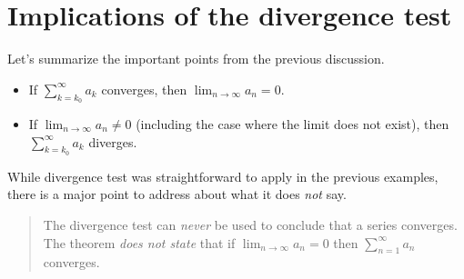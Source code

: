 \documentclass{ximera}
\begin{document}

\section{Implications of the divergence test}

Let's summarize the important points from the previous discussion.

\begin{itemize}
\item If $\sum_{k=k_0}^\infty a_k$ converges, then $\lim_{n \to \infty} a_n =0$.
\item If $\lim_{n \to \infty} a_n \neq 0$ (including the case where the limit does not exist), then $\sum_{k=k_0}^{\infty} a_k$ diverges.
\end{itemize}


While divergence test was straightforward to apply in the previous examples, there is a major point to address about what it does \emph{not} say.

\begin{quote}
  The divergence test can \emph{never} be used to conclude that a series converges. The theorem \emph{does not state} that if $\lim_{n\to\infty} a_n =
  0$ then $\sum_{n=1}^\infty a_n$ converges.

\end{quote}
  
\end{document}
